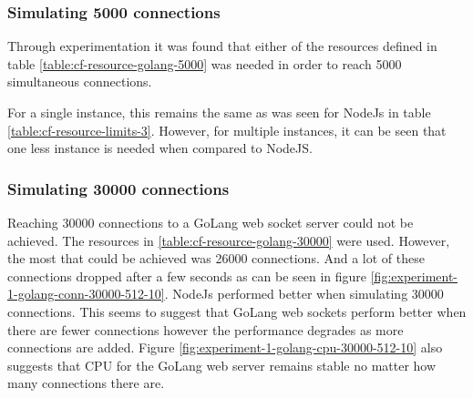 \subsubsection{Simulating 5000 connections}

Through experimentation it was found that either of the resources defined in table \ref{table:cf-resource-golang-5000} was needed in order to reach 5000 simultaneous connections.

\begin{table}[H]
\caption{Cloud Foundry Resource Limits}
\label{table:cf-resource-golang-5000}
\end{table}

For a single instance, this remains the same as was seen for NodeJs in table \ref{table:cf-resource-limits-3}. However, for multiple instances, it can be seen that one less instance is needed when compared to NodeJS. 

\subsubsection{Simulating 30000 connections}

Reaching 30000 connections to a GoLang web socket server could not be achieved. The resources in \ref{table:cf-resource-golang-30000} were used. However, the most that could be achieved was 26000 connections. And a lot of these connections dropped after a few seconds as can be seen in figure \ref{fig:experiment-1-golang-conn-30000-512-10}. NodeJs performed better when simulating 30000 connections. This seems to suggest that GoLang web sockets perform better when there are fewer connections however the performance degrades as more connections are added. Figure \ref{fig:experiment-1-golang-cpu-30000-512-10} also suggests that CPU for the GoLang web server remains stable no matter how many connections there are.

\begin{table}[H]
\caption{Cloud Foundry Resource Limits}
\label{table:cf-resource-golang-30000}
\end{table}


